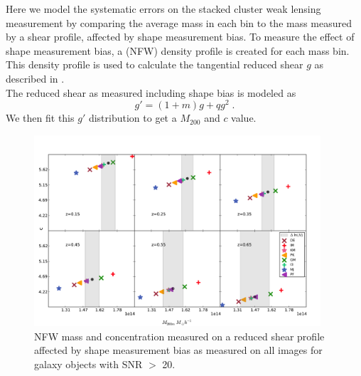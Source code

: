 Here we model the systematic errors on the stacked cluster weak
lensing measurement by comparing the average mass in each bin
to the mass measured by a shear profile, affected by shape 
measurement bias. To measure the effect of shape measurement bias, a \citet*{1997ApJ...490..493N} (NFW) density profile is created for each mass bin. This density profile is
used to calculate the tangential reduced shear $g$ as described in \cite{NFW}. \\

The reduced shear as measured including shape bias is modeled as 
\begin{equation}
g' = (1+m)g + qg^2 \; .
\end{equation}
We then fit this $ g' $ distribution to get a $M_{200}$ and $ c $
value. 


\begin{figure}
 \centering  %
  \includegraphics[width=0.95\textwidth]{fig/M_NFW_1.pdf} 
  \caption{NFW mass and concentration measured on a reduced shear
    profile affected by shape measurement bias
   as measured on all images for galaxy objects with SNR $>$ 20.}
\label{fig:M_NFW_1}
\end{figure}


